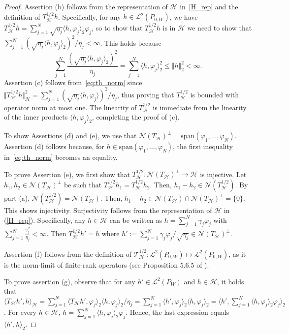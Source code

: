 \documentclass[twoside,11pt]{article}
\newcommand{\mc}{\mathcal}
\begin{document}
\begin{proof}
Assertion (b) follows from the representation of $\mc{H}$ in~\eqref{H_rep} and the definition of $T_{\mc{H}}^{1/2} h$. Specifically, for any $h \in \mc{L}^2(P_{0,W})$, we have $T_{\mc{H}}^{1/2}h=\sum_{j=1}^N\sqrt{\eta_j}\langle h,\varphi_j\rangle_2\varphi_j$, so to show that $T_{\mc{H}}^{1/2}h$ is in $\mc{H}$ we need to show that $\sum_{j=1}^N(\sqrt{\eta_j}\langle h,\varphi_j\rangle_2)^2/\eta_j < \infty$. This holds because
\begin{equation}
\sum_{j=1}^N\frac{\left(\sqrt{\eta_j}\langle h,\varphi_j\rangle_2\right)^2}{\eta_j}=\sum_{j=1}^N\langle h,\varphi_j\rangle_2^2\le \Vert h\Vert_2^2<\infty.\label{eq:th_norm}
\end{equation}
 Assertion (c) follows from~\eqref{eq:th_norm} since $\Vert T^{1/2}_\mc{H}h\Vert_\mc{H}^2 = \sum_{j=1}^N\left(\sqrt{\eta_j}\langle h,\varphi_j\rangle\right)^2/\eta_j$, thus proving that $T^{1/2}_\mc{H}$ is bounded with operator norm at most one. The linearity of $T^{1/2}_\mc{H}$ is immediate from the linearity of the inner products \(\langle h, \varphi_j \rangle_2\), completing the proof of (c).

To show Assertions (d) and (e), we use that $\mc{N}(T_\mc{H})^\perp=\text{span}(\varphi_1,\dots,\varphi_N)$. Assertion (d) follows because, for $h\in\text{span}(\varphi_1,\dots,\varphi_N)$, the first inequality in~\eqref{eq:th_norm} becomes an equality.

To prove Assertion (e), we first show that $T_{\mc{H}}^{1/2}:\mc{N}(T_\mc{H})^\perp \rightarrow \mc{H}$ is injective. Let $h_1,h_2\in\mc{N}(T_\mc{H})^\perp$ be such that $T_\mc{H}^{1/2}h_1=T_\mc{H}^{1/2}h_2$. Then, $h_1-h_2\in\mc{N}(T_\mc{H}^{1/2})$. By part (a), $\mc{N}(T_\mc{H}^{1/2}) = \mc{N}(T_\mc{H})$. Then, $h_1-h_2\in\mc{N}(T_\mc{H}) \cap \mc{N}(T_\mc{H})^\perp =\{0\}$. This shows injectivity. Surjectivity follows from the representation of $\mc{H}$ in (\ref{H_rep}). Specifically, any $h\in\mc{H}$ can be written as $h=\sum_{j=1}^N\gamma_j\varphi_j$ with $\sum_{j=1}^N\frac{\gamma_j^2}{\eta_j}<\infty$.
Then $T_\mc{H}^{1/2}h'=h$ where $h':=\sum_{j=1}^N\gamma_j\varphi_j/\sqrt{\eta_j}\in\mc{N}(T_\mc{H})^\perp$.

Assertion (f) follows from the definition of $\mc{T}_{\mc{H}}^{1/2}:\mc{L}^2(P_{0,W})\mapsto\mc{L}^2(P_{0,W})$, as it is the norm-limit of finite-rank operators (see Proposition 5.6.5 of \cite{conway2012course}).

To prove assertion (g), observe that for any $h'\in\mc{L}^2(P_W)$ and $h\in\mc{H}$, it holds that $ \langle T_\mc{H}h',h\rangle_\mc{H}=\sum_{j=1}^N\langle T_\mc{H}h',\varphi_j\rangle_2\langle h,\varphi_j\rangle_2/\eta_j=\sum_{j=1}^N\langle h',\varphi_j\rangle_2\langle h,\varphi_j\rangle_2=\langle h',\sum_{j=1}^N\langle h,\varphi_j\rangle_2\varphi_j\rangle_2$.
For every $h\in\mc{H}$, $h=\sum_{j=1}^N\langle h,\varphi_j\rangle_2\varphi_j$. Hence, the last expression equals $\langle h',h\rangle_2$.
\end{proof}
\end{document}
